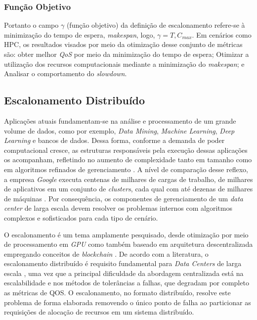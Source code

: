\subsubsection{Função Objetivo}
Portanto o campo $\gamma$ (função objetivo) da definição de escalonamento refere-se à minimização do tempo de espera, \textit{makespan}, logo, $\gamma = T, C_{max}$. Em cenários como \ac{HPC}, os resultados visados por meio da otimização desse conjunto de métricas são: obter melhor \textit{QoS} por meio da minimização do tempo de espera; Otimizar a utilização dos recursos computacionais mediante a minimização do \textit{makespan}; e Analisar o comportamento do \textit{slowdown}.

\subsection{Escalonamento Distribuído}

Aplicações atuais fundamentam-se na análise e processamento de um grande volume de dados, como por exemplo, \textit{Data Mining}, \textit{Machine Learning}, \textit{Deep Learning} e bancos de dados. Dessa forma, conforme a demanda de poder computacional cresce, as estruturas responsáveis pela execução dessas aplicações os acompanham, refletindo no aumento de complexidade tanto em tamanho como em algoritmos refinados de gerenciamento \cite{Wang2016LoadbalancedAL}. A nível de comparação desse reflexo, a empresa \textit{Google} executa centenas de milhares de cargas de trabalho, de milhares de aplicativos em um conjunto de \textit{clusters}, cada qual com até dezenas de milhares de máquinas \cite{Google2015Borg}. 
Por consequência, os componentes de gerenciamento de um \textit{data center} de larga escala devem resolver os problemas internos com algoritmos complexos e sofisticados para cada tipo de cenário.

O escalonamento é um tema amplamente pesquisado, desde otimização por meio de processamento em \textit{GPU} \cite{Nesi2018ScheduleGPU} como também baseado em arquitetura descentralizada empregando conceitos de \textit{blockchain} \cite{loch2021novel}. De acordo com a literatura, o escalonamento distribuído é requisito fundamental para \textit{Data Centers} de larga escala \cite{Google2015Borg, Wang2019Pigeon}, uma vez que a principal dificuldade da abordagem centralizada está na escalabilidade e nos métodos de tolerâncias a falhas, que degradam por completo as métricas de \ac{QOS}. O escalonamento, no formato distribuído, resolve este problema de forma elaborada removendo o único ponto de falha ao particionar as requisições de alocação de recursos em um sistema distribuído.

